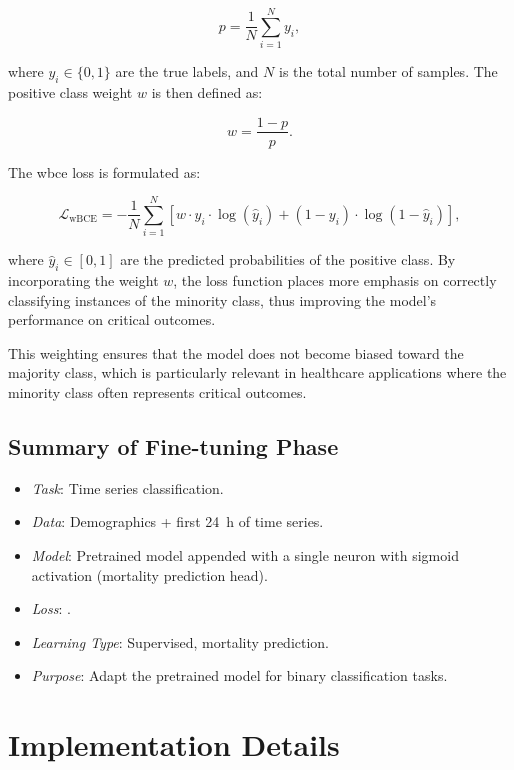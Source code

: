 \[
p = \frac{1}{N} \sum_{i=1}^{N} y_i,
\]

where \(y_i \in \{0,1\}\) are the true labels, and \(N\) is the total number of samples. The positive class weight \(w\) is then defined as:

\begin{equation}
    \label{eq:positive_class_weight}
    w = \frac{1 - p}{p}.
\end{equation}

The \gls{wbce} loss is formulated as:

\begin{equation}
    \label{eq:wBCE}
    \mathcal{L}_{\text{wBCE}} = - \frac{1}{N} \sum_{i=1}^{N} \left[ w \cdot y_i \cdot \log(\hat{y}_i) + (1 - y_i) \cdot \log(1 - \hat{y}_i) \right],
\end{equation}

where \(\hat{y}_i \in [0,1]\) are the predicted probabilities of the positive class. By incorporating the weight \(w\), the loss function places more emphasis on correctly classifying instances of the minority class, thus improving the model's performance on critical outcomes.

This weighting ensures that the model does not become biased toward the majority class, which is particularly relevant in healthcare applications where the minority class often represents critical outcomes.



\subsection{Summary of Fine-tuning Phase}

\begin{itemize}
    \item \emph{Task}: Time series classification.
    \item \emph{Data}: Demographics + first \qty{24}{\hour} of time series.
    \item \emph{Model}: Pretrained model appended with a single neuron with sigmoid activation (mortality prediction head).
    \item \emph{Loss}: .
    \item \emph{Learning Type}: Supervised, mortality prediction.
    \item \emph{Purpose}: Adapt the pretrained model for binary classification tasks.
\end{itemize}

\section{Implementation Details}
\label{sec:implementation_details}

